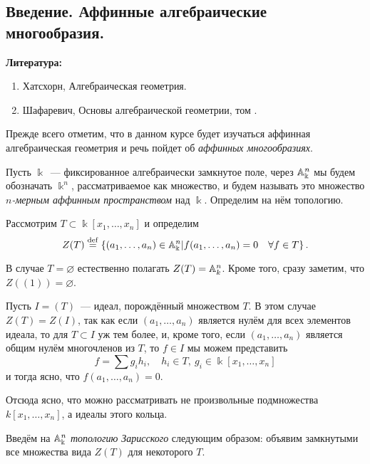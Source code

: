 	\subsection{Введение. Аффинные алгебраические многообразия. }
	
	\bf{Литература:}

	\begin{enumerate}
		\item Хатсхорн, Алгебраическая геометрия. 

		\item Шафаревич, Основы алгебраической геометрии, том . 
	\end{enumerate}

	Прежде всего отметим, что в данном курсе будет изучаться аффинная алгебраическая геометрия и речь пойдет об \emph{аффинных многообразиях}. 

	Пусть $\Bbbk$~--- фиксированное алгебраически замкнутое поле, через $\AA_{\Bbbk}^n$ мы будем обозначать $\Bbbk^n$, рассматриваемое как множество, и будем называть это множество \emph{$n$-мерным аффинным пространством} над $\Bbbk$. Определим на нём топологию. 

	Рассмотрим $T \subset \Bbbk[x_1, \ldots, x_n]$ и определим 
	\[
		Z(T) \eqdef \left\{ (a_1, \ldots, a_n) \in \AA_{\Bbbk}^n \vert f(a_1, \ldots, a_n) = 0 \quad \forall f \in T \right\}. 
	\]

	\begin{remark}
		В случае $T = \varnothing$ естественно полагать $Z(T) = \AA_{k}^n$. Кроме того, сразу заметим, что $Z((1)) = \varnothing$. 
	\end{remark}

	Пусть $I = (T)$~--- идеал, порождённый множеством $T$. В этом случае $Z(T) = Z(I)$, так как если $(a_1, \ldots, a_n)$ является нулём для всех элементов идеала, то для $T \subset I$ уж тем более, и, кроме того, если $(a_1, \ldots, a_n)$ является общим нулём многочленов из $T$, то $f \in I$ мы можем представить 
	\[
		f = \sum g_i h_i, \quad h_i \in T, \ g_i \in \Bbbk[x_1, \ldots, x_n]
	\]
	и тогда ясно, что $f(a_1, \ldots, a_n) = 0$. 

	Отсюда ясно, что можно рассматривать не произвольные подмножества $k[x_1, \ldots, x_n]$, а идеалы этого кольца. 

	\begin{definition} 
		Введём на $\AA_{\Bbbk}^n$ \emph{топологию Зарисского} следующим образом: объявим замкнутыми все множества вида $Z(T)$ для некоторого $T$. 
	\end{definition}

